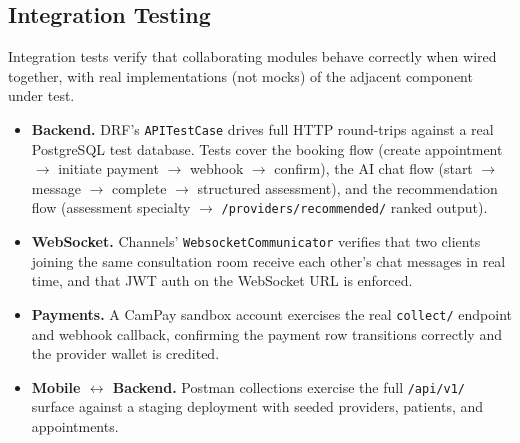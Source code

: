 \subsection{Integration Testing}

Integration tests verify that collaborating modules behave correctly when wired together, with real implementations (not mocks) of the adjacent component under test.

\begin{itemize}
  \item \textbf{Backend.} DRF's \texttt{APITestCase} drives full HTTP round-trips against a real PostgreSQL test database. Tests cover the booking flow (create appointment $\rightarrow$ initiate payment $\rightarrow$ webhook $\rightarrow$ confirm), the AI chat flow (start $\rightarrow$ message $\rightarrow$ complete $\rightarrow$ structured assessment), and the recommendation flow (assessment specialty $\rightarrow$ \texttt{/providers/recommended/} ranked output).
  \item \textbf{WebSocket.} Channels' \texttt{WebsocketCommunicator} verifies that two clients joining the same consultation room receive each other's chat messages in real time, and that JWT auth on the WebSocket URL is enforced.
  \item \textbf{Payments.} A CamPay sandbox account exercises the real \texttt{collect/} endpoint and webhook callback, confirming the payment row transitions correctly and the provider wallet is credited.
  \item \textbf{Mobile $\leftrightarrow$ Backend.} Postman collections exercise the full \texttt{/api/v1/} surface against a staging deployment with seeded providers, patients, and appointments.
\end{itemize}

